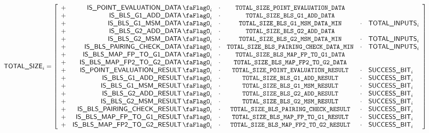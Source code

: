 \[
    \blsTotalSize _{i}
    =
    \left[ \begin{array}{crcccl}
        + & \isPointEvaluationData _{i} & \cdot & \totalSizePointEvaluationData \\
        + & \isBlsGOneAddData  _{i} & \cdot & \totalSizeBlsGOneAddData    \\
        + & \isBlsGOneMsmData  _{i} & \cdot & \totalSizeBlsGOneMsmDataMin & \cdot & \totalInputs      _{i} \\
        + & \isBlsGTwoAddData  _{i} & \cdot & \totalSizeBlsGTwoAddData    \\
        + & \isBlsGTwoMsmData  _{i} & \cdot & \totalSizeBlsGTwoMsmDataMin & \cdot & \totalInputs      _{i} \\
        + & \isBlsPairingCheckData _{i} & \cdot & \totalSizeBlsPairingCheckDataMin & \cdot & \totalInputs _{i} \\
        + & \isBlsMapFpToGOneData _{i} & \cdot & \totalSizeBlsMapFpToGOneData \\
        + & \isBlsMapFpTwoToGTwoData _{i} & \cdot & \totalSizeBlsMapFpTwoToGTwoData \\
        + & \isPointEvaluationResult _{i} & \cdot & \totalSizePointEvaluationResult & \cdot & \blsSuccessBit _{i} \\
        + & \isBlsGOneAddResult _{i} & \cdot & \totalSizeBlsGOneAddResult & \cdot & \blsSuccessBit _{i} \\
        + & \isBlsGOneMsmResult _{i} & \cdot & \totalSizeBlsGOneMsmResult & \cdot & \blsSuccessBit _{i} \\
        + & \isBlsGTwoAddResult _{i} & \cdot & \totalSizeBlsGTwoAddResult & \cdot & \blsSuccessBit _{i} \\
        + & \isBlsGTwoMsmResult _{i} & \cdot & \totalSizeBlsGTwoMsmResult & \cdot & \blsSuccessBit _{i} \\
        + & \isBlsPairingCheckResult _{i} & \cdot & \totalSizeBlsPairingCheckResult & \cdot & \blsSuccessBit _{i} \\
        + & \isBlsMapFpToGOneResult _{i} & \cdot & \totalSizeBlsMapFpToGOneResult & \cdot & \blsSuccessBit _{i} \\
        + & \isBlsMapFpTwoToGTwoResult _{i} & \cdot & \totalSizeBlsMapFpTwoToGTwoResult & \cdot & \blsSuccessBit _{i} \\
    \end{array} \right]
\]

